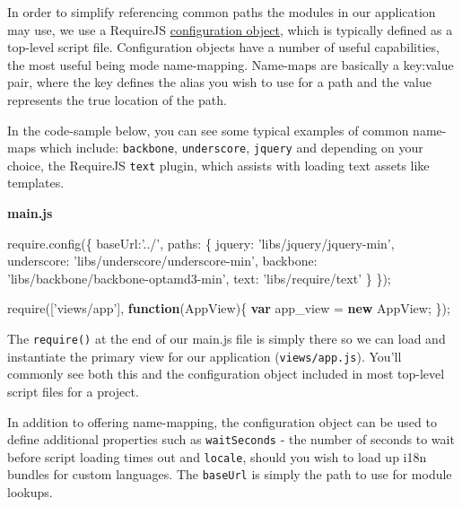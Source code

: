 \documentclass[9pt]{book}
\newenvironment{Shaded}{}{}
\newcommand{\KeywordTok}[1]{\textcolor[rgb]{0.00,0.44,0.13}{\textbf{{#1}}}}
\newcommand{\DataTypeTok}[1]{\textcolor[rgb]{0.56,0.13,0.00}{{#1}}}
\newcommand{\StringTok}[1]{\textcolor[rgb]{0.25,0.44,0.63}{{#1}}}
\newcommand{\OtherTok}[1]{\textcolor[rgb]{0.00,0.44,0.13}{{#1}}}
\newcommand{\FunctionTok}[1]{\textcolor[rgb]{0.02,0.16,0.49}{{#1}}}
\newcommand{\NormalTok}[1]{{#1}}
\begin{document}
In order to simplify referencing common paths the modules in our
application may use, we use a RequireJS
\href{http://requirejs.org/docs/api.html\#config}{configuration object},
which is typically defined as a top-level script file. Configuration
objects have a number of useful capabilities, the most useful being mode
name-mapping. Name-maps are basically a key:value pair, where the key
defines the alias you wish to use for a path and the value represents
the true location of the path.

In the code-sample below, you can see some typical examples of common
name-maps which include: \texttt{backbone}, \texttt{underscore},
\texttt{jquery} and depending on your choice, the RequireJS
\texttt{text} plugin, which assists with loading text assets like
templates.

\textbf{main.js}

\begin{Shaded}
\begin{Highlighting}[]
\OtherTok{require}\NormalTok{.}\FunctionTok{config}\NormalTok{(\{}
  \DataTypeTok{baseUrl}\NormalTok{:}\StringTok{'../'}\NormalTok{,}
  \DataTypeTok{paths}\NormalTok{: \{}
    \DataTypeTok{jquery}\NormalTok{: }\StringTok{'libs/jquery/jquery-min'}\NormalTok{,}
    \DataTypeTok{underscore}\NormalTok{: }\StringTok{'libs/underscore/underscore-min'}\NormalTok{,}
    \DataTypeTok{backbone}\NormalTok{: }\StringTok{'libs/backbone/backbone-optamd3-min'}\NormalTok{,}
    \DataTypeTok{text}\NormalTok{: }\StringTok{'libs/require/text'}
  \NormalTok{\}}
\NormalTok{\});}

\FunctionTok{require}\NormalTok{([}\StringTok{'views/app'}\NormalTok{], }\KeywordTok{function}\NormalTok{(AppView)\{}
  \KeywordTok{var} \NormalTok{app_view = }\KeywordTok{new} \NormalTok{AppView;}
\NormalTok{\});}
\end{Highlighting}
\end{Shaded}

The \texttt{require()} at the end of our main.js file is simply there so
we can load and instantiate the primary view for our application
(\texttt{views/app.js}). You'll commonly see both this and the
configuration object included in most top-level script files for a
project.

In addition to offering name-mapping, the configuration object can be
used to define additional properties such as \texttt{waitSeconds} - the
number of seconds to wait before script loading times out and
\texttt{locale}, should you wish to load up i18n bundles for custom
languages. The \texttt{baseUrl} is simply the path to use for module
lookups.
\end{document}
